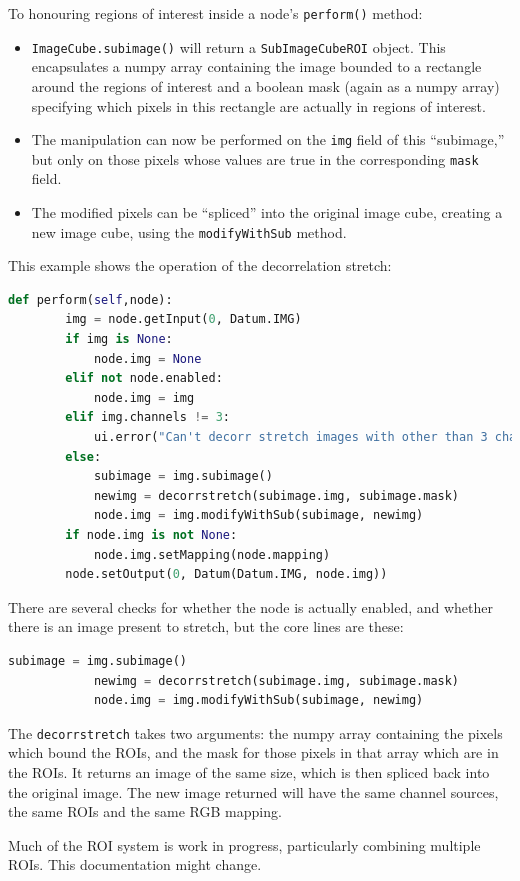 To honouring regions of interest inside a node's \texttt{perform()} method:
\begin{itemize}
\item \texttt{ImageCube.subimage()} will return a \texttt{SubImageCubeROI} object. This encapsulates
a numpy array containing the image bounded to a rectangle around the regions of interest and
a boolean mask (again as a numpy array) specifying which pixels in this rectangle are actually
in regions of interest.
\item The manipulation can now be performed on the \texttt{img} field of this ``subimage,'' but
only on those pixels whose values are true in the corresponding \texttt{mask} field.
\item The modified pixels can be ``spliced'' into the original image cube, creating a new image
cube, using the \texttt{modifyWithSub} method.
\end{itemize}
This example shows the operation of the decorrelation stretch:
\begin{lstlisting}[language=Python]
    def perform(self,node):
        img = node.getInput(0, Datum.IMG)
        if img is None:
            node.img = None
        elif not node.enabled:
            node.img = img
        elif img.channels != 3:
            ui.error("Can't decorr stretch images with other than 3 channels")
        else:
            subimage = img.subimage()
            newimg = decorrstretch(subimage.img, subimage.mask)
            node.img = img.modifyWithSub(subimage, newimg)
        if node.img is not None:
            node.img.setMapping(node.mapping)
        node.setOutput(0, Datum(Datum.IMG, node.img))
\end{lstlisting}
There are several checks for whether the node is actually enabled, and whether there is an image
present to stretch, but the core lines are these:
\begin{lstlisting}[language=Python]
            subimage = img.subimage()
            newimg = decorrstretch(subimage.img, subimage.mask)
            node.img = img.modifyWithSub(subimage, newimg)
\end{lstlisting}
The \texttt{decorrstretch} takes two arguments: the numpy array containing the pixels which bound
the ROIs, and the mask for those pixels in that array which are in the ROIs. It returns an image
of the same size, which is then spliced back into the original image. The new image returned
will have the same channel sources, the same ROIs and the same RGB mapping.

\begin{notebox}
Much of the ROI system is work in progress, particularly combining
multiple ROIs. This documentation might change.
\end{notebox}


